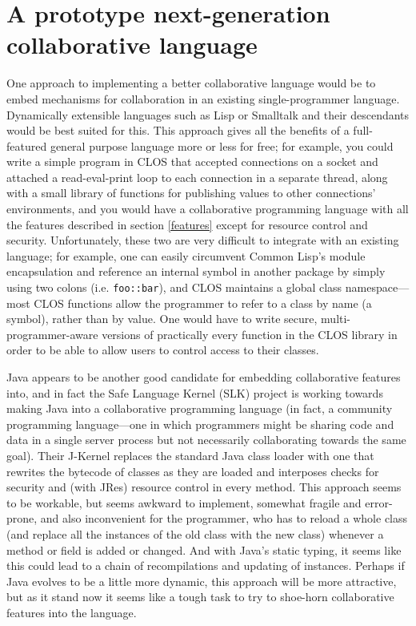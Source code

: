 \documentclass{article}
\begin{document}
\section{A prototype next-generation collaborative language}

One approach to implementing a better collaborative language would be
to embed mechanisms for collaboration in an existing single-programmer
language.  Dynamically extensible languages such as Lisp or Smalltalk
and their descendants would be best suited for this.  This approach
gives all the benefits of a full-featured general purpose language
more or less for free; for example, you could write a simple program
in CLOS\cite{Lisp} that accepted connections on a socket and attached
a read-eval-print loop to each connection in a separate thread, along
with a small library of functions for publishing values to other
connections' environments, and you would have a collaborative
programming language with all the features described in section
\ref{features} except for resource control and security.
Unfortunately, these two are very difficult to integrate with an
existing language; for example, one can easily circumvent Common
Lisp's module encapsulation and reference an internal symbol in
another package by simply using two colons (i.e. \texttt{foo::bar}),
and CLOS maintains a global class namespace---most CLOS functions
allow the programmer to refer to a class by name (a symbol), rather
than by value.  One would have to write secure, multi-programmer-aware
versions of practically every function in the CLOS library in order to
be able to allow users to control access to their classes.

Java appears to be another good candidate for embedding collaborative
features into, and in fact the Safe Language Kernel (SLK)
project\cite{SLK} is working towards making Java into a collaborative
programming language (in fact, a community programming language---one
in which programmers might be sharing code and data in a single server
process but not necessarily collaborating towards the same goal).
Their J-Kernel\cite{J-Kernel} replaces the standard Java class loader
with one that rewrites the bytecode of classes as they are loaded and
interposes checks for security and (with JRes\cite{JRes}) resource
control in every method.  This approach seems to be workable, but
seems awkward to implement, somewhat fragile and error-prone, and also
inconvenient for the programmer, who has to reload a whole class (and
replace all the instances of the old class with the new class)
whenever a method or field is added or changed.  And with Java's
static typing, it seems like this could lead to a chain of
recompilations and updating of instances.  Perhaps if Java evolves to
be a little more dynamic, this approach will be more attractive, but
as it stand now it seems like a tough task to try to shoe-horn
collaborative features into the language.
\end{document}
